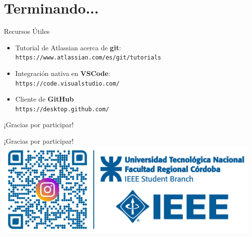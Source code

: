 \documentclass{beamer}
\begin{document}
    \section{Terminando...}
    \begin{frame}{Recursos Útiles}
        \begin{itemize}
            \item Tutorial de Atlassian acerca de \textbf{git}:\\
            \texttt{https://www.atlassian.com/es/git/tutorials}
            \item Integración nativa en \textbf{VSCode}:\\
            \texttt{https://code.visualstudio.com/}
            \item Cliente de \textbf{GitHub}\\
            \texttt{https://desktop.github.com/}
        \end{itemize}
    \end{frame}
    \begin{frame}[plain]{¡Gracias por participar!}
        \begin{center}
            \huge{¡Gracias por participar!}
            \includegraphics[width=\textwidth]{qr-conlogo.pdf}
        \end{center}
    \end{frame}
    
    
\end{document}
